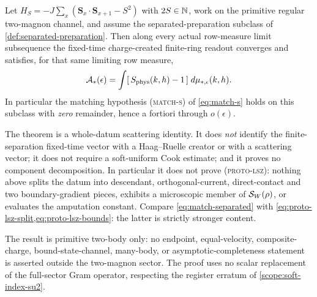 \begin{theorem}
\label{thm:match-separated}
\statusProved

Let $H_S=-J\sum_x(\mathbf S_x\cdot\mathbf S_{x+1}-S^2)$ with $2S\in\mathbb{N}$, work on
the primitive regular two-magnon channel, and assume the separated-preparation
subclass of \cref{def:separated-preparation}. Then along every actual
row-measure limit subsequence the fixed-time charge-created finite-ring
readout converges and satisfies, for that same limiting row measure,
\begin{equation}
  \mathcal{A}_*(\epsilon)=\int[\,S_{\rm phys}(k,h)-1\,]\;d\mu_{*,\epsilon}(k,h).
  \label{eq:match-separated}
\end{equation}
In particular the matching hypothesis \textsc{(match-s)} of
\cref{eq:match-s} holds on this subclass with \emph{zero} remainder, hence a
fortiori through $o(\epsilon)$.
\end{theorem}

\begin{scope}
\label{scope:match-separated}
The theorem is a whole-datum scattering identity. It does \emph{not} identify
the finite-separation fixed-time vector with a Haag--Ruelle creator or with a
scattering vector; it does not require a soft-uniform Cook estimate; and it
proves no component decomposition. In particular it does not prove
\textsc{(proto-lsz)}: nothing above splits the datum into descendant,
orthogonal-current, direct-contact and two boundary-gradient pieces, exhibits
a microscopic member of $\mathcal{S}_W(\rho)$, or evaluates the amputation
constant. Compare \cref{eq:match-separated} with
\cref{eq:proto-lsz-split,eq:proto-lsz-bounds}: the latter is strictly stronger
content.

The result is primitive two-body only: no endpoint, equal-velocity,
composite-charge, bound-state-channel, many-body, or asymptotic-completeness
statement is asserted outside the two-magnon sector. The proof uses no scalar
replacement of the full-sector Gram operator, respecting the register erratum
of \cref{scope:soft-index-su2}.
\end{scope}

